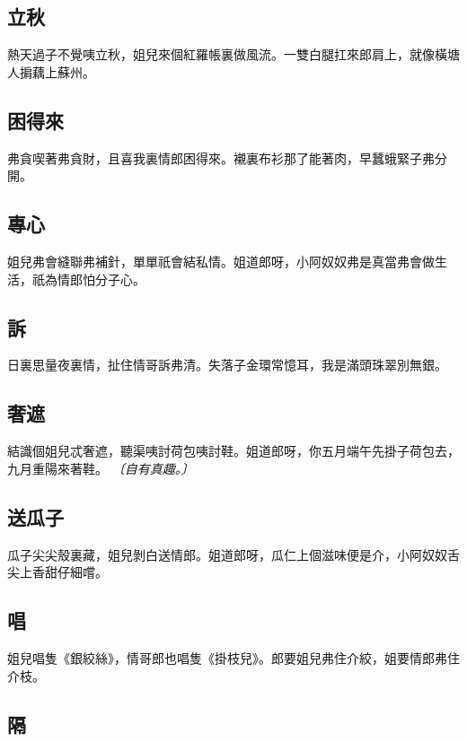 \subsection*{立秋}

熱天過子不覺咦立秋，姐兒來個紅羅帳裏做風流。一雙白腿扛來郎肩上，就像橫塘人掮藕上蘇州。

\subsection*{困得來}

弗貪喫著弗貪財，且喜我裏情郎困得來。襯裏布衫那了能著肉，早蠶蛾緊子弗分開。

\subsection*{專心}

姐兒弗會縫聯弗補針，單單祇會結私情。姐道郎呀，小阿奴奴弗是真當弗會做生活，祇為情郎怕分子心。

\subsection*{訴}

日裏思量夜裏情，扯住情哥訴弗清。失落子金環常憶耳，我是滿頭珠翠別無銀。

\subsection*{奢遮}

結識個姐兒忒奢遮，聽渠咦討荷包咦討鞋。姐道郎呀，你五月端午先掛子荷包去，九月重陽來著鞋。
\textit{〔自有真趣。〕}

\subsection*{送瓜子}

瓜子尖尖殼裏藏，姐兒剝白送情郎。姐道郎呀，瓜仁上個滋味便是介，小阿奴奴舌尖上香甜仔細嚐。

\subsection*{唱}

姐兒唱隻《銀絞絲》，情哥郎也唱隻《掛枝兒》。郎要姐兒弗住介絞，姐要情郎弗住介枝。

\subsection*{隔}

